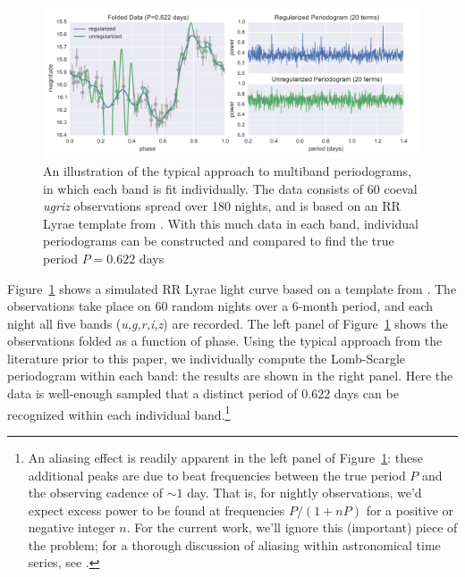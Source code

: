 \documentclass[12pt,preprint]{aastex}
\newcommand{\Fig}[1]{Figure~\ref{fig:#1}}
\newcommand{\fig}[1]{\Fig{#1}}
\newcommand{\figlabel}[1]{\label{fig:#1}}
\begin{document}
\begin{figure}
  \centering
  \includegraphics[width=\textwidth]{fig04.pdf}
  \caption{
    An illustration of the typical approach to multiband periodograms,
    in which each band is fit individually. The data consists of 60 coeval
    {\it ugriz} observations spread over 180 nights, and is based on an
    RR Lyrae template from \citet{Sesar2010}. With this much data in each
    band, individual periodograms can be constructed and compared to find the
    true period $P=0.622$ days
  }
  \figlabel{adhoc_example}
\end{figure}

\fig{adhoc_example} shows a simulated RR Lyrae light curve based on a template from \citet{Sesar2010}. The observations take place on 60 random nights over a 6-month period, and each night all five bands ({\it u,g,r,i,z}) are recorded. The left panel of \fig{adhoc_example} shows the observations folded as a function of phase.
Using the typical approach from the literature prior to this paper, we individually compute the Lomb-Scargle periodogram within each band: the results are shown in the right panel. Here the data is well-enough sampled that a distinct period of 0.622 days can be recognized within each individual band.\footnote{\label{foot1}
  An aliasing effect is readily apparent in the left panel of \fig{adhoc_example}: these additional peaks are due to beat frequencies between the true period $P$ and the observing cadence of $\sim 1$ day. That is, for nightly observations, we'd expect excess power to be found at frequencies $P / (1 + nP)$ for a positive or negative integer $n$. For the current work, we'll ignore this (important) piece of the problem; for a thorough discussion of aliasing within astronomical time series, see \citet{Roberts87}.}
\end{document}

